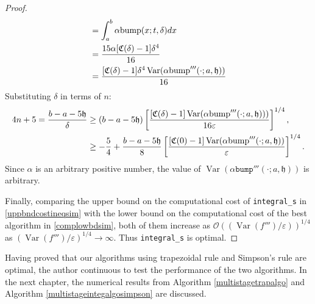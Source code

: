 \documentclass{iitthesis}
\DeclareMathOperator{\Var}{Var}
\theoremstyle{definition}
\theoremstyle{remark}
\begin{document}
\begin{proof}
\begin{subequations}
\begin{align*}
     &=\int_{a}^{b}\alpha\textup{bump}(x;t,\delta)dx\\
     &=\frac{15\alpha[\mathfrak{C}(\delta)-1]\delta^4}{16}\\
     &=\frac{[\mathfrak{C}(\delta)-1]\delta^4\Var(\alpha\textup{bump}'''(\cdot;a,\mathfrak{h}))}{16}
  \end{align*}
  \end{subequations}
  Substituting $\delta$  in terms of $n$:
      \begin{align*}
        4n+5=\frac{b-a-5\mathfrak{h}}{\delta}&\ge(b-a-5\mathfrak{h})\left[\frac{[\mathfrak{C}(\delta)-1]\Var(\alpha \textup{bump}'''(\cdot;a,\mathfrak{h})))}{16\varepsilon}\right]^{1/4},\\
        &\ge-\frac{5}{4}+\frac{b-a-5\mathfrak{h}}{8}\left[\frac{[\mathfrak{C}(0)-1]\Var(\alpha \textup{bump}'''(\cdot;a,\mathfrak{h}))}{\varepsilon}\right]^{1/4}.
    \end{align*}
    Since $\alpha$ is an arbitrary positive number, the value of $\Var(\alpha \texttt{bump}'''(\cdot;a,\mathfrak{h}))$ is arbitrary.

    Finally, comparing the upper bound on the computational cost of {\tt integral\_s} in \eqref{uppbndcostineqsim} with the lower bound on the computational cost of the best algorithm in \eqref{complowbdsim}, both of them increase as $\mathcal{O}((\Var(f''')/\varepsilon))^{1/4}$ as $(\Var(f''')/\varepsilon)^{1/4}\rightarrow \infty$. Thus {\tt integral\_s} is optimal.
\end{proof}

Having proved that our algorithms using trapezoidal rule and Simpson's rule are optimal, the author continuous to test the performance of the two algorithms. In the next chapter, the numerical results from Algorithm \ref{multistagetrapalgo} and Algorithm \ref{multistageintegalgosimpson} are discussed.

\end{document}
